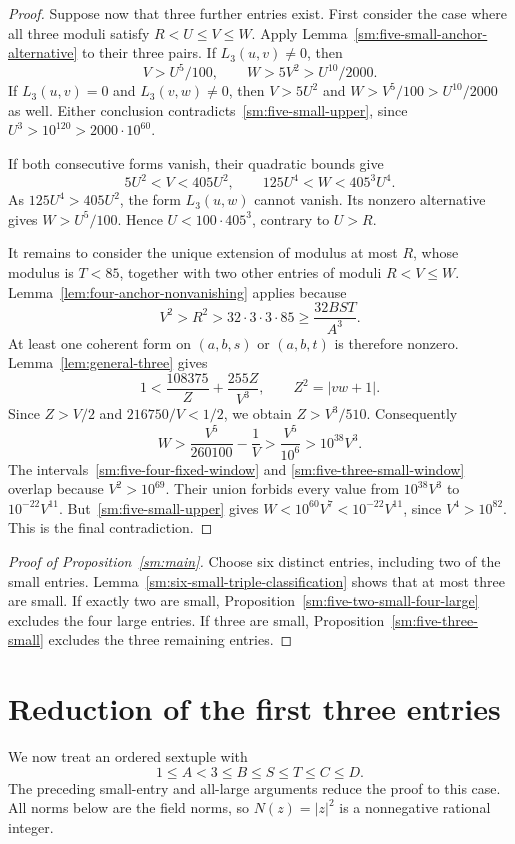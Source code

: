 \documentclass[12pt]{article}
\numberwithin{equation}{section}
\begin{document}
\begin{proof}
Suppose now that three further entries exist. First consider the
case where all three moduli satisfy $R<U\le V\le W$.
Apply Lemma~\ref{sm:five-small-anchor-alternative} to their three pairs.
If $L_3(u,v)\ne0$, then
\[
 V>U^5/100,\qquad W>5V^2>U^{10}/2000.
\]
If $L_3(u,v)=0$ and $L_3(v,w)\ne0$, then
$V>5U^2$ and $W>V^5/100>U^{10}/2000$ as well.
Either conclusion contradicts~\eqref{sm:five-small-upper}, since
$U^3>10^{120}>2000\cdot10^{60}$.

If both consecutive forms vanish, their quadratic bounds give
\[
 5U^2<V<405U^2,\qquad
 125U^4<W<405^3U^4.
\]
As $125U^4>405U^2$, the form $L_3(u,w)$ cannot vanish.
Its nonzero alternative gives $W>U^5/100$. Hence
$U<100\cdot405^3$, contrary to $U>R$.

It remains to consider the unique extension of modulus at most $R$,
whose modulus is $T<85$, together with two other entries of moduli
$R<V\le W$.
Lemma~\ref{lem:four-anchor-nonvanishing} applies because
\[
 V^2>R^2>32\cdot3\cdot3\cdot85\ge\frac{32BST}{A^3}.
\]
At least one coherent form on $(a,b,s)$ or $(a,b,t)$ is therefore
nonzero. Lemma~\ref{lem:general-three} gives
\[
 1<\frac{108375}{Z}+\frac{255Z}{V^3},\qquad Z^2=|vw+1|.
\]
Since $Z>V/2$ and $216750/V<1/2$, we obtain $Z>V^3/510$.
Consequently
\[
 W>\frac{V^5}{260100}-\frac1V
   >\frac{V^5}{10^6}>10^{38}V^3.
\]
The intervals~\eqref{sm:five-four-fixed-window} and
\eqref{sm:five-three-small-window} overlap because $V^2>10^{69}$.
Their union forbids every value from $10^{38}V^3$ to
$10^{-22}V^{11}$. But~\eqref{sm:five-small-upper} gives
$W<10^{60}V^7<10^{-22}V^{11}$, since $V^4>10^{82}$.
This is the final contradiction.
\end{proof}


\begin{proof}[Proof of Proposition~\ref{sm:main}]
Choose six distinct entries, including two of the small entries.
Lemma~\ref{sm:six-small-triple-classification} shows that at most three
are small. If exactly two are small, Proposition~\ref{sm:five-two-small-four-large}
excludes the four large entries. If three are small,
Proposition~\ref{sm:five-three-small} excludes the three remaining entries.
\end{proof}

\section{Reduction of the first three entries}
\label{sec:pair-reduction}

We now treat an ordered sextuple with
\[
 1\le A<3\le B\le S\le T\le C\le D.
\]
The preceding small-entry and all-large arguments reduce the proof to this
case. All norms below are the field norms, so \(N(z)=|z|^2\) is a
nonnegative rational integer.
\end{document}
